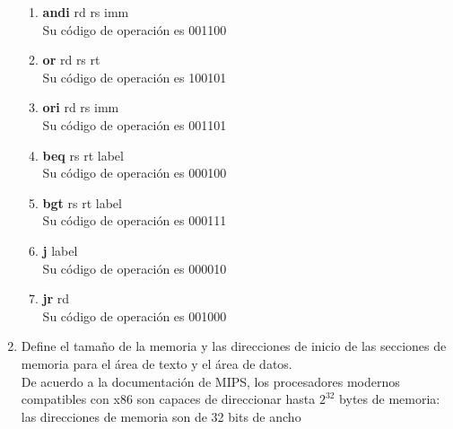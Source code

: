 \documentclass{article}
\begin{document}
\begin{enumerate}
{\begin{enumerate}
			\item{ \textbf{andi} rd rs imm\\
				Su código de operación es 001100\\
			}
			
			\item{ \textbf{or} rd rs rt\\
				Su código de operación es 100101\\
			}
			
			\item{ \textbf{ori} rd rs imm\\
				Su código de operación es 001101\\
			}
			
			\item{ \textbf{beq} rs rt label\\
				Su código de operación es 000100 \\
			}
			
			\item{ \textbf{bgt} rs rt label\\
				Su código de operación es 000111\\
			}
			
			\item{ \textbf{j} label\\
				Su código de operación es 000010\\ 
			}
			
			\item{ \textbf{jr} rd\\
				Su código de operación es 001000
			}
		\end{enumerate}
		}
		\item {
			Define el tamaño de la memoria y las direcciones de inicio de las secciones de memoria para el área de texto y el área de datos.\\
			
			De acuerdo a la documentación de MIPS, los procesadores modernos compatibles con x86 son capaces de direccionar hasta $2^{32}$ bytes de memoria: las direcciones de memoria son de 32 bits de ancho
		}
	\end{enumerate}
\end{document}
